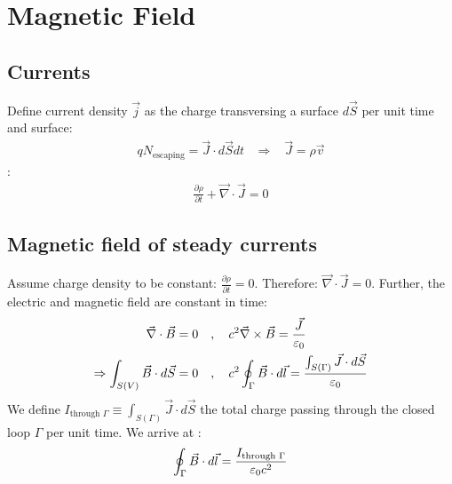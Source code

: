 \section{Magnetic Field}

\subsection{Currents}

Define current density $\vec{j}$ as the charge transversing a surface $d \vec{S}$
per unit time and surface:
\begin{align*}
    q N_{\text{escaping}} = \vec{J} \cdot d \vec{S} dt
    \hspace{10pt} \Rightarrow \hspace{10pt}
    \vec{J} = \rho \vec{v}
\end{align*}
:
\begin{align*}
    \frac{\partial \rho}{\partial t} + \vec{\nabla} \cdot \vec{J} = 0
\end{align*}

\subsection{Magnetic field of steady currents}

Assume charge density to be constant: $\frac{\partial \rho}{\partial t} = 0$.
Therefore: $\vec{\nabla} \cdot \vec{J} = 0$. Further, the electric and
magnetic field are constant in time:
\begin{align*}
    \vec{\nabla} \cdot \vec{B} = 0
    \hspace{10pt} &, \hspace{10pt}
    c^2 \vec{\nabla} \times \vec{B} = \frac{\vec{J}}{\varepsilon_0}
    \\
    \Rightarrow
    \int_{S(V)} \vec{B} \cdot d \vec{S} = 0
    \hspace{10pt} &, \hspace{10pt}
    c^2 \oint_{\Gamma} \vec{B} \cdot d \vec{l} = \frac{\int_{S(\Gamma)} \vec{J} \cdot d \vec{S}}{\varepsilon_0}
\end{align*}
We define $I_{\text{through } \Gamma} \equiv \int_{S(\Gamma)} \vec{J} \cdot d \vec{S}$
the total charge passing through the closed loop $\Gamma$ per unit time.
We arrive at :
\begin{align*}
    \oint_{\Gamma} \vec{B} \cdot d \vec{l} = \frac{I_{\text{through } \Gamma}}{\varepsilon_0 c^2}
\end{align*}

